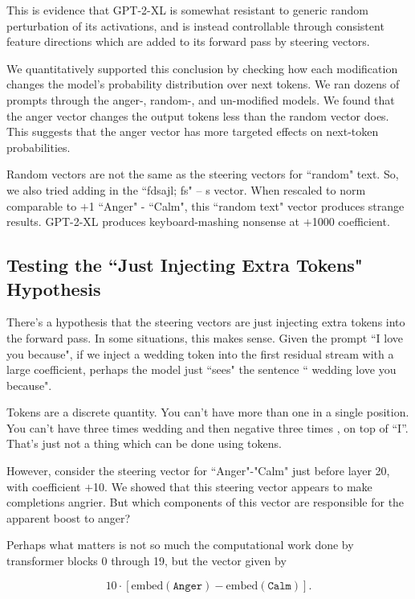 \documentclass[10pt]{article}
\newcommand{\embed}{\mathrm{embed}}
\begin{document}
This is evidence that GPT-2-XL is somewhat resistant to generic random perturbation of its activations, and is instead controllable through consistent feature directions which are added to its forward pass by steering vectors. 

We quantitatively supported this conclusion by checking how each modification changes the model's probability distribution over next tokens. We ran dozens of prompts through the anger-, random-, and un-modified models. We found that the anger vector changes the output tokens less than the random vector does. This suggests that the anger vector has more targeted effects on next-token probabilities.


Random vectors are not the same as the steering vectors for ``random" text. So, we also tried adding in the ``fdsajl; fs" – {\textvisiblespace}s vector. When rescaled to norm comparable to $+$1 ``Anger" - ``Calm", this ``random text" vector produces strange results. GPT-2-XL produces keyboard-mashing nonsense at $+$1000 coefficient.

\subsection{Testing the ``Just Injecting Extra Tokens" Hypothesis}
There's a hypothesis that the steering vectors are just injecting extra tokens into the forward pass. In some situations, this makes sense. Given the prompt ``I love you because", if we inject a  wedding token into the first residual stream with a large coefficient, perhaps the model just ``sees" the sentence `` wedding love you because".

Tokens are a discrete quantity. You can't have more than one in a single position. You can't have three times {\textvisiblespace}wedding and then negative three times \textvisiblespace, on top of ``I''. That's just not a thing which can be done using tokens.

However, consider the steering vector for ``Anger"-"Calm" just before layer 20, with coefficient $+$10. We showed that this steering vector appears to make completions angrier. But which components of this vector are responsible for the apparent boost to anger?

Perhaps what matters is not so much the computational work done by transformer blocks 0 through 19, but the vector given by%

\begin{equation}
10 \cdot [\embed(\texttt{Anger})-\embed(\texttt{Calm})].
\end{equation}
\end{document}
